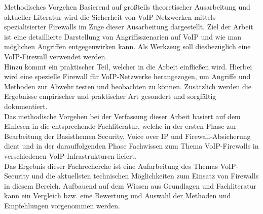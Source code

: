 \documentclass[a4paper,11pt,ngerman]{INSOexpose}
\begin{document}
\begin{section}{Methodisches Vorgehen}
Basierend auf großteils theoretischer Ausarbeitung und aktueller Literatur wird die Sicherheit von VoIP-Netzwerken mittels spezialisierter Firewalls im Zuge dieser Ausarbeitung dargestellt.
Ziel der Arbeit ist eine detaillierte Darstellung von Angriffsszenarien auf VoIP und wie man möglichen Angriffen entgegenwirken kann. Als Werkzeug soll diesbezüglich eine VoIP-Firewall verwendet werden. 
\\
Hinzu kommt ein praktischer Teil, welcher in die Arbeit einfließen wird. Hierbei wird eine spezielle Firewall für VoIP-Netzwerke herangezogen, um Angriffe und Methoden zur Abwehr testen und beobachten zu können. Zusätzlich werden die Ergebnisse empirischer und praktischer Art gesondert und sorgfältig dokumentiert.
\\
Das methodische Vorgehen bei der Verfassung dieser Arbeit basiert auf dem Einlesen in die entsprechende Fachliteratur, welche in der ersten Phase zur Bearbeitung der Basisthemen Security, Voice over IP und Firewall-Absicherung dient und in der darauffolgenden Phase Fachwissen zum Thema VoIP-Firewalls in verschiedenen VoIP-Infrastrukturen liefert.
\\
Das Ergebnis dieser Fachrecherche ist eine Aufarbeitung des Themas VoIP-Security und die aktuellsten technischen Möglichkeiten zum Einsatz von Firewalls in diesem Bereich. 
Aufbauend auf dem Wissen aus Grundlagen und Fachliteratur kann ein Vergleich bzw. eine Bewertung und Auswahl der Methoden und Empfehlungen vorgenommen werden. 
\end{section}
\pagebreak
\end{document}
